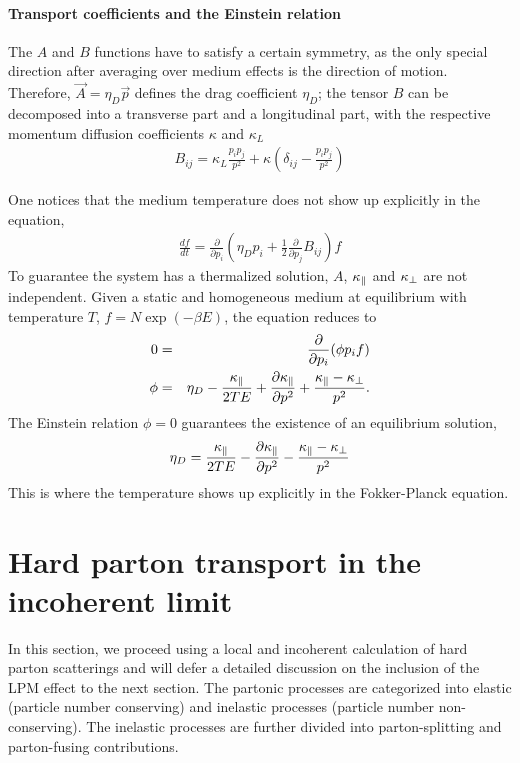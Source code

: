 \paragraph{Transport coefficients and the Einstein relation} 
The $A$ and $B$ functions have to satisfy a certain symmetry, as the only special direction after averaging over medium effects is the direction of motion.
Therefore,  $\vec{A} = \eta_D \vec{p}$ defines the drag coefficient  $\eta_D$; the tensor $B$ can be decomposed into a transverse part and a longitudinal part, with the respective momentum diffusion coefficients $\kappa$ and $\kappa_L$ 
\begin{eqnarray}
B_{ij} = \kappa_L \frac{p_i p_j}{p^2} + \kappa \left(\delta_{ij} - \frac{p_i p_j}{p^2}\right)
\end{eqnarray}

One notices that the medium temperature does not show up explicitly in the equation,
\begin{eqnarray}
\frac{df}{dt} = \frac{\partial}{\partial p_i}\left(\eta_D p_i + \frac{1}{2}\frac{\partial}{\partial p_j} B_{ij}\right)f
\end{eqnarray}
To guarantee the system has a thermalized solution, $A$, $\kappa_{\|}$ and $\kappa_{\perp}$ are not independent.
Given a static and homogeneous medium at equilibrium with temperature $T$, $f = N\exp\left(-\beta E\right)$, the equation reduces to
\begin{eqnarray}
0 &=& \frac{\partial}{\partial p_i}(\phi p_i f)\\
\phi &=& \eta_D - \frac{\kappa_{\|}}{2TE} + \frac{\partial \kappa_{\|}}{\partial p^2} + \frac{\kappa_{\|}-\kappa_{\perp}}{p^2}.
\end{eqnarray}
The Einstein relation $\phi = 0$ guarantees the existence of an equilibrium solution,
\begin{eqnarray}
\eta_D = \frac{\kappa_{\|}}{2TE} - \frac{\partial \kappa_{\|}}{\partial p^2} - \frac{\kappa_{\|}-\kappa_{\perp}}{p^2}
\label{eq:ein-rel}
\end{eqnarray}
This is where the temperature shows up explicitly in the Fokker-Planck equation.

\section{Hard parton transport in the incoherent limit}
In this section, we proceed using a local and incoherent calculation of hard parton scatterings and will defer a detailed discussion on the inclusion of the LPM effect to the next section.
The partonic processes are categorized into elastic (particle number conserving) and inelastic processes (particle number non-conserving). 
The inelastic processes are further divided into parton-splitting and parton-fusing contributions. 

